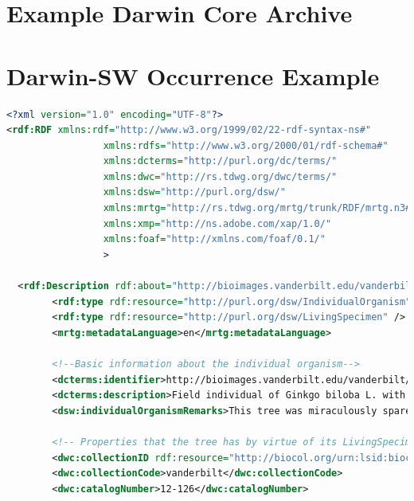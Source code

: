 \begin{appendices}
\chapter{Example Darwin Core Archive}\label{appendix:dwc}





\chapter{Darwin-SW Occurrence Example}\label{appendix:dsw}
\begin{lstlisting}[language=XML, caption={Darwin-SW Representation of a Living Specimen}]
<?xml version="1.0" encoding="UTF-8"?>
<rdf:RDF xmlns:rdf="http://www.w3.org/1999/02/22-rdf-syntax-ns#"
                 xmlns:rdfs="http://www.w3.org/2000/01/rdf-schema#"
                 xmlns:dcterms="http://purl.org/dc/terms/"
                 xmlns:dwc="http://rs.tdwg.org/dwc/terms/"
                 xmlns:dsw="http://purl.org/dsw/"
                 xmlns:mrtg="http://rs.tdwg.org/mrtg/trunk/RDF/mrtg.n3#"
                 xmlns:xmp="http://ns.adobe.com/xap/1.0/"
                 xmlns:foaf="http://xmlns.com/foaf/0.1/"
                 >

  <rdf:Description rdf:about="http://bioimages.vanderbilt.edu/vanderbilt/12-126">
        <rdf:type rdf:resource="http://purl.org/dsw/IndividualOrganism" />
        <rdf:type rdf:resource="http://purl.org/dsw/LivingSpecimen" />
        <mrtg:metadataLanguage>en</mrtg:metadataLanguage>
        
        <!--Basic information about the individual organism-->
        <dcterms:identifier>http://bioimages.vanderbilt.edu/vanderbilt/12-126</dcterms:identifier>
        <dcterms:description>Field individual of Ginkgo biloba L. with GUID: http://bioimages.vanderbilt.edu/vanderbilt/12-126</dcterms:description>
        <dsw:individualOrganismRemarks>This tree was miraculously spared from destruction in the building of the 21st Ave. crosswalk.</dsw:individualOrganismRemarks>
        
        <!-- Properties that the tree has by virtue of its LivingSpecimen type -->
        <dwc:collectionID rdf:resource="http://biocol.org/urn:lsid:biocol.org:col:35259" />
        <dwc:collectionCode>vanderbilt</dwc:collectionCode>
        <dwc:catalogNumber>12-126</dwc:catalogNumber>
        

\end{lstlisting}
\end{appendices}
